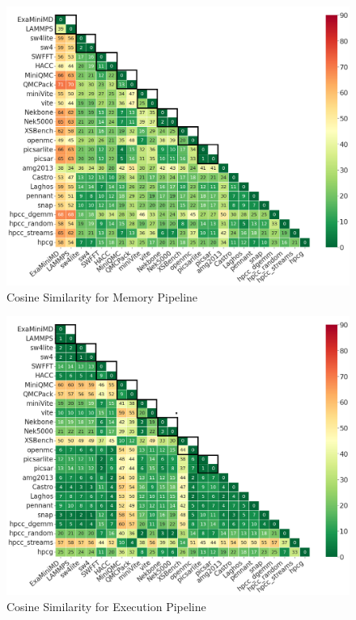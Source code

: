 \begin{figure}[ht]
\centering
\includegraphics[width=0.9\linewidth]{figs/Memory_Pipeline.png}
\caption{Cosine Similarity for Memory Pipeline }
\label{figs:cosine Memory_Pipeline}
\end{figure}

\begin{figure}[ht]
\centering
\includegraphics[width=0.9\linewidth]{figs/Execution_Pipeline.png}
\caption{Cosine Similarity for Execution Pipeline }
\label{figs:cosine Execution_Pipeline}
\end{figure}


